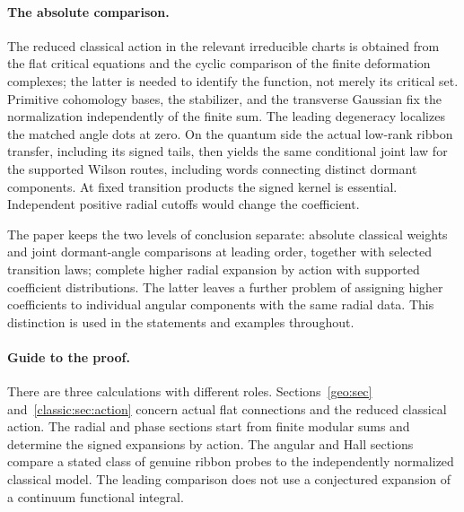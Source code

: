 \paragraph{The absolute comparison.}
The reduced classical action in the relevant irreducible charts is obtained from the flat critical equations and the cyclic comparison of the finite deformation complexes; the latter is needed to identify the function, not merely its critical set. Primitive cohomology bases, the stabilizer, and the transverse Gaussian fix the normalization independently of the finite sum. The leading degeneracy localizes the matched angle dots at zero. On the quantum side the actual low-rank ribbon transfer, including its signed tails, then yields the same conditional joint law for the supported Wilson routes, including words connecting distinct dormant components. At fixed transition products the signed kernel is essential. Independent positive radial cutoffs would change the coefficient.

The paper keeps the two levels of conclusion separate: absolute classical weights and joint dormant-angle comparisons at leading order, together with selected transition laws; complete higher radial expansion by action with supported coefficient distributions. The latter leaves a further problem of assigning higher coefficients to individual angular components with the same radial data. This distinction is used in the statements and examples throughout.


\paragraph{Guide to the proof.}
There are three calculations with different roles. Sections~\ref{geo:sec} and~\ref{classic:sec:action} concern actual flat connections and the reduced classical action. The radial and phase sections start from finite modular sums and determine the signed expansions by action. The angular and Hall sections compare a stated class of genuine ribbon probes to the independently normalized classical model. The leading comparison does not use a conjectured expansion of a continuum functional integral.
